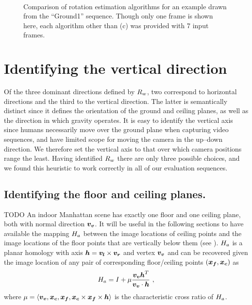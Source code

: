 \begin{figure}[tb]
  \centering
  \quad
  \\
  \quad
  \caption{Comparison of rotation estimation algorithms for an example
    drawn from the ``Ground1'' sequence. Though only one frame is
    shown here, each algorithm other than (c) was provided with 7
    input frames.}
  \label{fig:vpt-examples}
\end{figure}


\section{Identifying the vertical direction}
Of the three dominant directions defined by $\SceneR$, two correspond to
horizontal directions and the third to the vertical direction. The
latter is semantically distinct since it defines the orientation of
the ground and ceiling planes, as well as the direction in which
gravity operates. It is easy to identify the vertical axis since
humans necessarily move over the ground plane when capturing video
sequences, and have limited scope for moving the camera in the
up--down direction. We therefore set the vertical axis to that over
which camera positions range the least. Having identified $\SceneR$ there
are only three possible choices, and we found this heuristic to work
correctly in all of our evaluation sequences.


\subsection{Identifying the floor and ceiling planes.}
\label{sect:fcmap}
TODO
An indoor Manhattan scene has exactly one floor and one ceiling plane,
both with normal direction $\vvpt$. It will be useful in the following
sections to have available the mapping $\Hcf$ between the image
locations of ceiling points and the image locations of the floor
points that are vertically below them (see ). $\Hcf$ is
a planar homology with axis $\vect{h}=\lvpt\times\rvpt$ and vertex
$\vvpt$ \cite{Criminisi01} and can be recovered given the image
location of any pair of corresponding floor/ceiling points
$(\vect{x_f},\vect{x_c})$ as
\begin{equation}
  \Hcf = I + \mu\frac{\vvpt\vect{h}^T}{\vvpt \cdot \vect{h}} ~,
\end{equation}
where $\mu = \langle\vvpt,\vect{x_c},\vect{x_f},
\vect{x_c}\times\vect{x_f}\times\vect{h}\rangle$ is the characteristic cross
ratio of $\Hcf$.

